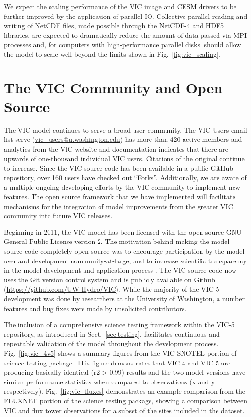 \documentclass[gmd, manuscript]{copernicus}
\begin{document}
    We expect the scaling performance of the VIC image and CESM drivers to be further improved by the application of parallel IO. Collective parallel reading and writing of NetCDF files, made possible through the NetCDF-4 and HDF5 libraries, are expected to dramatically reduce the amount of data passed via MPI processes and, for computers with high-performance parallel disks, should allow the model to scale well beyond the limits shown in Fig.~\ref{fig:vic_scaling}.

  \section{The VIC Community and Open Source}
    \label{sec:vic_community}
    The VIC model continues to serve a broad user community. The VIC Users email list-serve (\url{vic_users@u.washington.edu}) has more than 420 active members and analytics from the VIC website and documentation indicates that there are upwards of one-thousand individual VIC users. Citations of the original \citep{Liang_1994} continue to increase. Since the VIC source code has been available in a public GitHub repository, over 160 users have checked out ``Forks''. Additionally, we are aware of a multiple ongoing developing efforts by the VIC community to implement new features. The open source framework that we have implemented will facilitate mechanisms for the integration of model improvements from the greater VIC community into future VIC releases.

    Beginning in 2011, the VIC model has been licensed with the open source GNU General Public License version 2. The motivation behind making the model source code completely open-source was to encourage participation by the model user and development community-at-large, and to increase scientific transparency in the model development and application process \citep{Ince_2012}. The VIC source code now uses the Git version control system \citep{Torvalds_2010} and is publicly available on Github (\url{https://github.com/UW-Hydro/VIC}). While the majority of the VIC-5 development was done by researchers at the University of Washington, a number features and bug fixes were made by unsolicited contributors.

\conclusions[Conclusions]
\label{sec:conclusions}
  The inclusion of a comprehensive science testing framework within the VIC-5 repository, as introduced in Sect.~\ref{sec:testing}, facilitates continuous and repeatable validation of the model throughout the development process. Fig.~\ref{fig:vic_4v5} shows a summary figures from the VIC SNOTEL portion of science testing package. This figure demonstrates that VIC-4 and VIC-5 are producing basically identical (r2 > 0.99) results and the two model versions have similar performance statistics when compared to observations (x and y respectively). Fig.~\ref{fig:vic_fluxes} demonstrates an example comparison from the FLUXNET portion of the science testing package, showing a comparison between VIC and flux tower observations for a subset of the sites included in the dataset.
\end{document}
